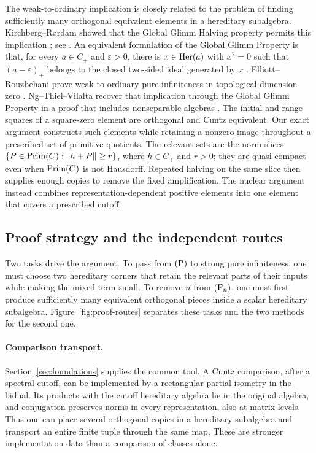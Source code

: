 The weak-to-ordinary implication is closely related to the problem of
finding sufficiently many orthogonal equivalent elements in a
hereditary subalgebra.  Kirchberg--R{\o}rdam showed that the Global
Glimm Halving property permits this implication
\cite[Proposition~4.15]{KR2002}; see
\cite[Theorem~39]{STW99problems}.  An equivalent formulation of the
Global Glimm Property is that, for every \(a\in C_+\) and
\(\varepsilon>0\), there is \(x\in\operatorname{Her}(a)\) with \(x^2=0\) such
that \((a-\varepsilon)_+\) belongs to the closed two-sided ideal
generated by \(x\) \cite[Remark~3.2 and Theorem~3.6(3)]{TV2023}.
Elliott--Rouzbehani prove weak-to-ordinary pure infiniteness in
topological dimension zero \cite{ER2023}.  Ng--Thiel--Vilalta recover
that implication through the Global Glimm Property in a proof that
includes nonseparable algebras
\cite[Theorem~2.3 and Corollary~2.5]{NTV2026}.
The initial and range squares of a square-zero element are
orthogonal and Cuntz equivalent.  Our exact argument constructs such
elements while retaining a nonzero image throughout a prescribed
set of primitive quotients.  The relevant sets are the norm slices
\(\{P\in\operatorname{Prim}(C):\|h+P\|\ge r\}\), where
\(h\in C_+\) and \(r>0\); they are quasi-compact even when
\(\operatorname{Prim}(C)\) is not Hausdorff.  Repeated halving on the same slice
then supplies enough copies to remove the fixed amplification.  The nuclear argument instead combines
representation-dependent positive elements into one element that
covers a prescribed cutoff.

\subsection{Proof strategy and the independent routes}

Two tasks drive the argument.  To pass from \(\textup{(P)}\) to strong
pure infiniteness, one must choose two hereditary corners that retain
the relevant parts of their inputs while making the mixed term small.
To remove \(n\) from \(\textup{(F\ensuremath{_n})}\), one must first produce sufficiently
many equivalent orthogonal pieces inside a scalar hereditary
subalgebra.  Figure~\ref{fig:proof-routes} separates these tasks and
the two methods for the second one.



\paragraph{Comparison transport.}
Section~\ref{sec:foundations} supplies the common tool.  A Cuntz
comparison, after a spectral cutoff, can be implemented by a
rectangular partial isometry in the bidual.  Its products with the
cutoff hereditary algebra lie in the original algebra, and conjugation
preserves norms in every representation, also at matrix levels.
Thus one can place several orthogonal copies in a hereditary
subalgebra and transport an entire finite tuple through the same map.
These are stronger implementation data than a comparison of classes
alone.


